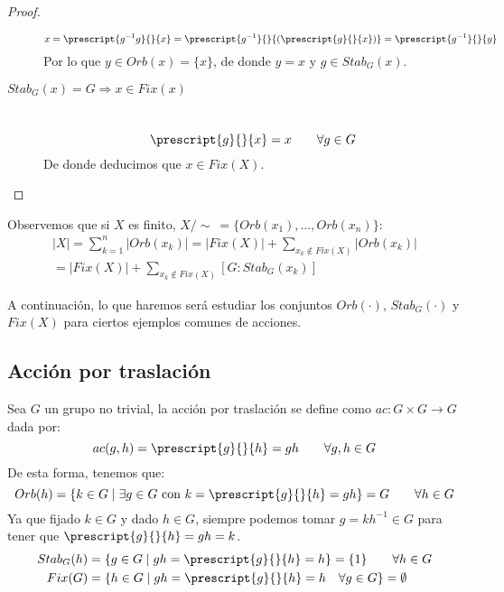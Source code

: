 \begin{prop}
\begin{proof}
\begin{description}
                \begin{equation*}
                    x = \prescript{g^{-1}g}{}{x} = \prescript{g^{-1}}{}{(\prescript{g}{}{x})} = \prescript{g^{-1}}{}{y}
                \end{equation*}
                Por lo que $y\in Orb(x) = \{x\}$, de donde $y=x$ y $g\in Stab_G(x)$.
            \item [$Stab_G(x) = G \Longrightarrow x\in Fix(x)$]~\\
                \begin{equation*}
                    \prescript{g}{}{x} = x \qquad \forall g\in G
                \end{equation*}
                De donde deducimos que $x\in Fix(X)$.
        \end{description}
    \end{proof}
\end{prop}

\noindent
Observemos que si $X$ es finito, $X/\sim\ = \{Orb(x_1), \ldots, Orb(x_n)\}$:
\begin{multline*}
    |X| = \sum_{k=1}^{n} |Orb(x_k)| = |Fix(X)| + \sum_{x_k \notin Fix(X)} |Orb(x_k)| \\ = |Fix(X)| + \sum_{x_k \notin Fix(X)} [G:Stab_G(x_k)]
\end{multline*}

\noindent
A continuación, lo que haremos será estudiar los conjuntos $Orb(\cdot )$, $Stab_G(\cdot )$ y $Fix(X)$ para ciertos ejemplos comunes de acciones.
\subsection{Acción por traslación}
\noindent
Sea $G$ un grupo no trivial, la acción por traslación se define como $ac:G\times G\to G$ dada por:
\begin{equation*}
    ac(g,h) = \prescript{g}{}{h} = gh \qquad \forall g,h\in G
\end{equation*}
De esta forma, tenemos que:
\begin{equation*}
    Orb(h) = \{k\in G \mid \exists g\in G \text{\ con\ } k = \prescript{g}{}{h} = gh\} = G \qquad \forall h\in G
\end{equation*}
Ya que fijado $k\in G$ y dado $h\in G$, siempre podemos tomar $g = kh^{-1}\in G$ para tener que $\prescript{g}{}{h} = gh = k$.
\begin{align*}
    Stab_G(h) &= \{g\in G \mid gh = \prescript{g}{}{h} = h\} = \{1\} \qquad \forall h\in G\\
    Fix(G) &= \{h\in G \mid gh = \prescript{g}{}{h}=h \quad \forall g\in G\} = \emptyset 
\end{align*}


